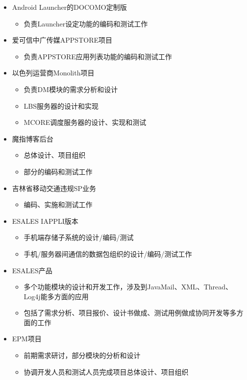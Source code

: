 \documentclass{resume}
\begin{document}
\begin{itemize}
  \item Android Launcher的DOCOMO定制版
  \begin{itemize}
    \item 负责Launcher设定功能的编码和测试工作
  \end{itemize}
  \item 爱可信中广传媒APPSTORE项目
  \begin{itemize}
    \item 负责APPSTORE应用列表功能的编码和测试工作
  \end{itemize}
  \item 以色列运营商Monolith项目
  \begin{itemize}
    \item 负责DM模块的需求分析和设计
    \item LBS服务器的设计和实现
    \item MCORE调度服务器的设计、实现和测试
  \end{itemize}
\end{itemize}

\begin{itemize}
  \item 魔指博客后台
  \begin{itemize}
    \item 总体设计、项目组织
    \item 部分的编码和测试工作
  \end{itemize}
  \item 吉林省移动交通违规SP业务
  \begin{itemize}
    \item 编码、实施和测试工作
  \end{itemize}
\end{itemize}

\begin{itemize}
  \item ESALES IAPPLI版本
  \begin{itemize}
    \item 手机端存储子系统的设计/编码/测试
    \item 手机/服务器间通信的数据包组织的设计/编码/测试工作
  \end{itemize}
  \item ESALES产品
  \begin{itemize}
    \item 多个功能模块的设计和开发工作，涉及到JavaMail、XML、Thread、Log4j能多方面的应用
    \item 包括了需求分析、项目报价、设计书做成、测试用例做成协同开发等多方面的工作
  \end{itemize}
  \item EPM项目
  \begin{itemize}
    \item 前期需求研讨，部分模块的分析和设计
    \item 协调开发人员和测试人员完成项目总体设计、项目组织
  \end{itemize}
\end{itemize}
\end{document}
